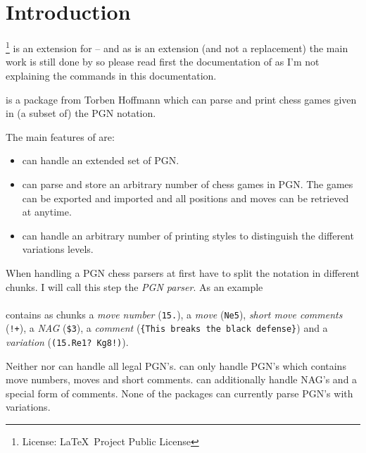 \documentclass[pagesize,parskip=half-,fontsize=12pt]{scrartcl}
\begin{document}
\section{Introduction}

\Xskak\footnote{License: \LaTeX\ Project Public License} is an extension for \skaksty -- and as \xskak is an extension
(and not a replacement) the main work is still done by \skaksty so
please read first the documentation of \skaksty as I'm not explaining
the  commands in this documentation.


\Skaksty is a package from Torben Hoffmann which can parse and print
chess games given in (a subset of) the PGN notation.

The main features of  are:

\begin{itemize}
\item {} can handle an extended set of PGN.

\item {}
can parse and store an arbitrary number of chess games in PGN. The
games can be exported and imported and all positions and moves can be
retrieved at anytime.

\item {} can
handle an arbitrary number of printing styles to distinguish
the different variations levels.


\end{itemize}






When handling a PGN chess parsers at first have to split the notation
in different chunks. I will call this step the \emph{PGN parser}.
As an example\\[1ex]\mbox{}\\[1ex] contains as
chunks a \emph{move number} (\texttt{15.}), a \emph{move}
(\texttt{Ne5}), \emph{short move comments} (\texttt{!+}), a
\emph{NAG} (\texttt{\$3}), a \emph{comment} (\texttt{\{This breaks
the black defense\}}) and a \emph{variation} (\texttt{(15.Re1?
Kg8!)}).

Neither  nor  can handle all
legal PGN's. \Skaksty can only handle PGN's which contains move
numbers, moves and short comments.  can
additionally handle NAG's and a special form of comments. None of the
packages can currently parse PGN's with variations.
\end{document}
